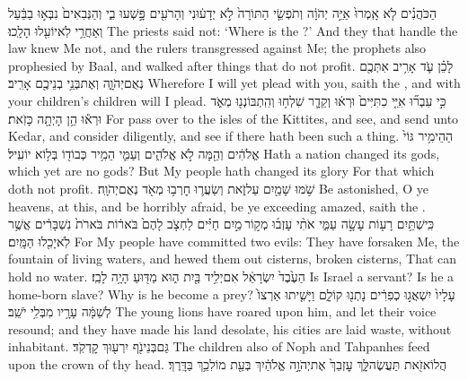 {הַכֹּהֲנִ֗ים לֹ֤א אָֽמְרוּ֙ אַיֵּ֣ה יְהֹוָ֔ה וְתֹפְשֵׂ֤י הַתּוֹרָה֙ לֹ֣א יְדָע֔וּנִי וְהָרֹעִ֖ים פָּ֣שְׁעוּ בִ֑י וְהַנְּבִאִים֙ נִבְּא֣וּ בַבַּ֔עַל וְאַחֲרֵ֥י לֹֽא\maqqaf יוֹעִ֖לוּ הָלָֽכוּ׃}
{The priests said not: ‘Where is the \lord?’ And they that handle the law knew Me not, and the rulers transgressed against Me; the prophets also prophesied by Baal, and walked after things that do not profit.}
{לָכֵ֗ן עֹ֛ד אָרִ֥יב אִתְּכֶ֖ם נְאֻם\maqqaf יְהֹוָ֑ה וְאֶת\maqqaf בְּנֵ֥י בְנֵיכֶ֖ם אָרִֽיב׃}
{Wherefore I will yet plead with you, saith the \lord, and with your children’s children will I plead.}
{כִּ֣י עִבְר֞וּ אִיֵּ֤י כִתִּיִּים֙ וּרְא֔וּ וְקֵדָ֛ר שִׁלְח֥וּ וְהִֽתְבּוֹנְנ֖וּ מְאֹ֑ד וּרְא֕וּ הֵ֥ן הָיְתָ֖ה כָּזֹֽאת׃}
{For pass over to the isles of the Kittites, and see, and send unto Kedar, and consider diligently, and see if there hath been such a thing.}
{הַהֵימִ֥יר גּוֹי֙ אֱלֹהִ֔ים וְהֵ֖מָּה לֹ֣א אֱלֹהִ֑ים וְעַמִּ֛י הֵמִ֥יר כְּבוֹד֖וֹ בְּל֥וֹא יוֹעִֽיל׃}
{Hath a nation changed its gods, which yet are no gods? But My people hath changed its glory For that which doth not profit.}
{שֹׁ֥מּוּ שָׁמַ֖יִם עַל\maqqaf זֹ֑את וְשַׂעֲר֛וּ חׇרְב֥וּ מְאֹ֖ד נְאֻם\maqqaf יְהֹוָֽה׃}
{Be astonished, O ye heavens, at this, and be horribly afraid, be ye exceeding amazed, saith the \lord.}
{כִּֽי\maqqaf שְׁתַּ֥יִם רָע֖וֹת עָשָׂ֣ה עַמִּ֑י אֹתִ֨י עָזְב֜וּ מְק֣וֹר \legarmeh  מַ֣יִם חַיִּ֗ים לַחְצֹ֤ב לָהֶם֙ בֹּאר֔וֹת בֹּארֹת֙ נִשְׁבָּרִ֔ים אֲשֶׁ֥ר לֹֽא\maqqaf יָכִ֖לוּ הַמָּֽיִם׃}
{For My people have committed two evils: They have forsaken Me, the fountain of living waters, and hewed them out cisterns, broken cisterns, That can hold no water.}
{הַעֶ֙בֶד֙ יִשְׂרָאֵ֔ל אִם\maqqaf יְלִ֥יד בַּ֖יִת ה֑וּא מַדּ֖וּעַ הָיָ֥ה לָבַֽז׃}
{Is Israel a servant? Is he a home-born slave? Why is he become a prey?}
{עָלָיו֙ יִשְׁאֲג֣וּ כְפִרִ֔ים נָתְנ֖וּ קוֹלָ֑ם וַיָּשִׁ֤יתוּ אַרְצוֹ֙ לְשַׁמָּ֔ה עָרָ֥יו  מִבְּלִ֥י יֹשֵֽׁב׃}
{The young lions have roared upon him, and let their voice resound; and they have made his land desolate, his cities are laid waste, without inhabitant.}
{גַּם\maqqaf בְּנֵי\maqqaf נֹ֖ף  יִרְע֖וּךְ קׇדְקֹֽד׃}
{The children also of Noph and Tahpanhes feed upon the crown of thy head.}
{הֲלוֹא\maqqaf זֹ֖את תַּעֲשֶׂה\maqqaf לָּ֑ךְ עׇזְבֵךְ֙ אֶת\maqqaf יְהֹוָ֣ה אֱלֹהַ֔יִךְ בְּעֵ֖ת מוֹלִכֵ֥ךְ בַּדָּֽרֶךְ׃}
